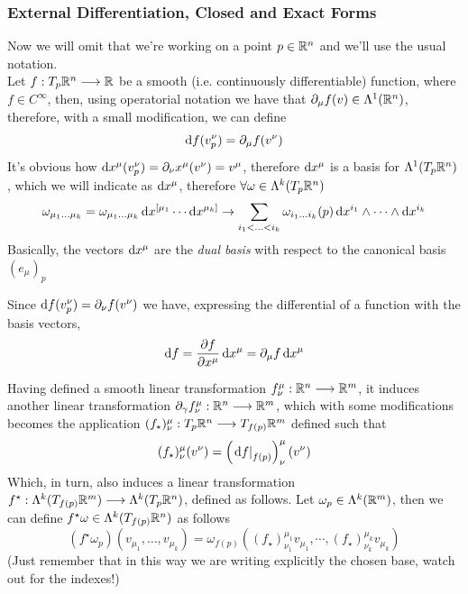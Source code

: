 \documentclass[../complete.tex]{subfiles}
\begin{document}
\subsubsection{External Differentiation, Closed and Exact Forms}
\begin{dfn}[Differential]
	Now we will omit that we're working on a point $p\in\R^n$ and we'll use the usual notation.\\
	Let $f:T_p\R^n\fto\R$ be a smooth (i.e. continuously differentiable) function, where $f\in C^\infty$, then, using operatorial notation we have that $\del_\mu f(v)\in\Lambda^1(\R^n)$, therefore, with a small modification, we can define
	\begin{equation}
		\diff f(v^\nu_p)=\del_\mu f(v^\nu)
		\label{eq:differential1}
	\end{equation}
	It's obvious how $\diff x^\mu(v^\nu_p)=\del_\nu x^\mu(v^\nu)=v^\mu$, therefore $\diff x^\mu$ is a basis for $\Lambda^1(T_p\R^n)$, which we will indicate as $\diff x^\mu$, therefore $\forall\omega\in\Lambda^k(T_p\R^n)$
	\begin{equation}
		\omega_{\mu_1\ldots\mu_k}=\omega_{\mu_1\ldots\mu_k}\diff x^{[\mu_1}\cdots\diff x^{\mu_k]}\to\sum_{i_1<\ldots<i_k}\omega_{i_1\ldots i_k}(p)\diff x^{i_1}\wedge\cdots\wedge\diff x^{i_k}
		\label{eq:difform2}
	\end{equation}
	Basically, the vectors $\diff x^\mu$ are the \textit{dual basis} with respect to the canonical basis $(e_\mu)_p$
\end{dfn}
\begin{thm}
	Since $\diff f(v^\nu_p)=\del_\nu f(v^\nu)$ we have, expressing the differential of a function with the basis vectors,
	\begin{equation}
		\diff f=\pdv{f}{x^\mu}\diff x^\mu=\del_\mu f\diff x^\mu
		\label{eq:funcdiff}
	\end{equation}
\end{thm}
\begin{dfn}
	Having defined a smooth linear transformation $f^\mu_\nu:\R^n\fto\R^m$, it induces another linear transformation $\del_{\gamma}f^\mu_\nu:\R^n\fto\R^m$, which with some modifications becomes the application $(f_\star)^\mu_\nu:T_p\R^n\fto T_{f(p)}\R^m$ defined such that
	\begin{equation}
		(f_\star)^\mu_\nu(v^\nu)=\left(\derin[f(p)]{\diff f}\right)^\mu_\nu(v^\nu)
		\label{eq:fstarlowsmooth}
	\end{equation}
	Which, in turn, also induces a linear transformation $f^\star:\Lambda^k(T_{f(p)}\R^m)\fto\Lambda^k(T_p\R^n)$, defined as follows. Let $\omega_p\in\Lambda^k(\R^m)$, then we can define $f^\star\omega\in\Lambda^k(T_{f(p)}\R^n)$ as follows
	\begin{equation}
		(f^\star\omega_p)(v_{\mu_1},\ldots,v_{\mu_k})=\omega_{f(p)}\left( (f_\star)^{\mu_1}_{\nu_1}v_{\mu_1},\cdots,(f_\star)^{\mu_k}_{\nu_k}v_{\mu_k}\right)
		\label{eq:fstaromega}
	\end{equation}
	(Just remember that in this way we are writing explicitly the chosen base, watch out for the indexes!)
\end{dfn}
\end{document}
